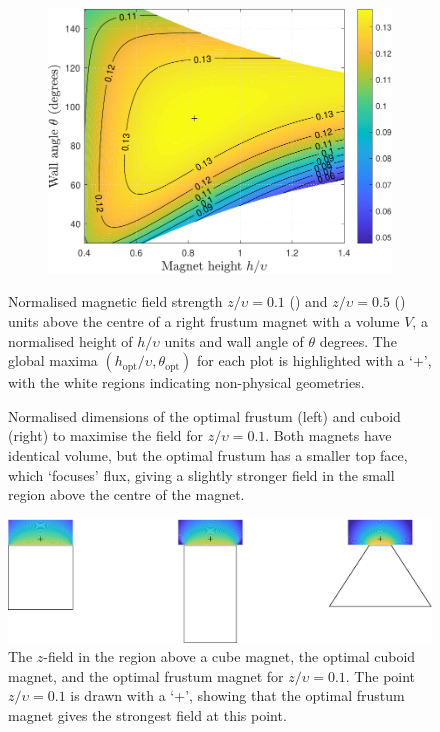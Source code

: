 \begin{figure}
	\begin{subfigure}{0.8\textwidth}
		\includegraphics[width=\linewidth]{p3/p3FIG5b}
		\subcaption{}
		\label{subfig:p3centralField500}
	\end{subfigure}
	\caption{Normalised magnetic field strength \(z/\upsilon = 0.1\) () and \(z/\upsilon = 0.5\) () units above the centre of a right frustum magnet with a volume \(V\), a normalised height of \(h/\upsilon\) units and wall angle of \(\theta\) degrees. The global maxima \(\left( h_\text{opt}/\upsilon, \theta_\text{opt}\right)\) for each plot is highlighted with a `+', with the white regions indicating non-physical geometries.}
	\label{fig:p3centralField}
\end{figure}
\begin{figure}
	\centering
	
	\caption{Normalised dimensions of the optimal frustum (left) and cuboid (right) to maximise the field for \(z/\upsilon = 0.1\). Both magnets have identical volume, but the optimal frustum has a smaller top face, which `focuses' flux, giving a slightly stronger field in the small region above the centre of the magnet.}
	\label{fig:p3optimalGeom_z_0_1}
\end{figure}
\begin{figure}
	\centering
	\includegraphics[width=\linewidth]{p3/p3FIG7}
	\caption{The \(z\)-field in the region above a cube magnet, the optimal cuboid magnet, and the optimal frustum magnet for \(z/\upsilon = 0.1\). The point \(z/\upsilon = 0.1\) is drawn with a `+', showing that the optimal frustum magnet gives the strongest field at this point.}
	\label{fig:p3optimalFrusAndCube}
\end{figure}

